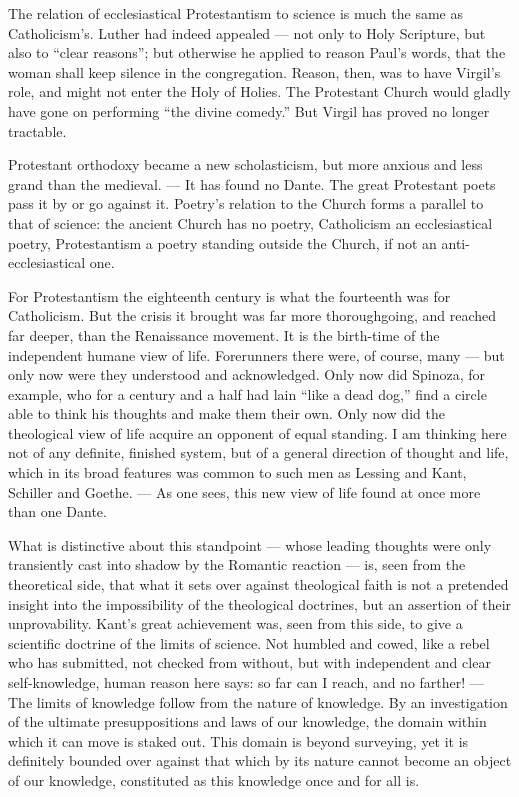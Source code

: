 \documentclass[12pt,a4paper]{article}
\begin{document}
The relation of ecclesiastical Protestantism to science is much the same as
Catholicism's. Luther had indeed appealed --- not only to Holy Scripture, but
also to ``clear reasons''; but otherwise he applied to reason Paul's words,
that the woman shall keep silence in the congregation. Reason, then, was to
have Virgil's role, and might not enter the Holy of Holies. The Protestant
Church would gladly have gone on performing ``the divine comedy.'' But Virgil
has proved no longer tractable.

Protestant orthodoxy became a new scholasticism, but more anxious and less
grand than the medieval. --- It has found no Dante. The great Protestant poets
pass it by or go against it. Poetry's relation to the Church forms a parallel
to that of science: the ancient Church has no poetry, Catholicism an
ecclesiastical poetry, Protestantism a poetry standing outside the Church, if
not an anti-ecclesiastical one.

For Protestantism the eighteenth century is what the fourteenth was for
Catholicism. But the crisis it brought was far more thoroughgoing, and reached
far deeper, than the Renaissance movement. It is the birth-time of the
independent humane view of life. Forerunners there were, of course, many ---
but only now were they understood and acknowledged. Only now did Spinoza, for
example, who for a century and a half had lain ``like a dead dog,'' find a
circle able to think his thoughts and make them their own. Only now did the
theological view of life acquire an opponent of equal standing. I am thinking
here not of any definite, finished system, but of a general direction of
thought and life, which in its broad features was common to such men as
Lessing and Kant, Schiller and Goethe. --- As one sees, this new view of life
found at once more than one Dante.

What is distinctive about this standpoint --- whose leading thoughts were only
transiently cast into shadow by the Romantic reaction --- is, seen from the
theoretical side, that what it sets over against theological faith is not a
pretended insight into the impossibility of the theological doctrines, but an
assertion of their unprovability. Kant's great achievement was, seen from this
side, to give a scientific doctrine of the limits of science. Not humbled and
cowed, like a rebel who has submitted, not checked from without, but with
independent and clear self-knowledge, human reason here says: so far can I
reach, and no farther! --- The limits of knowledge follow from the nature of
knowledge. By an investigation of the ultimate presuppositions and laws of our
knowledge, the domain within which it can move is staked out. This domain is
beyond surveying, yet it is definitely bounded over against that which by its
nature cannot become an object of our knowledge, constituted as this knowledge
once and for all is.
\end{document}

